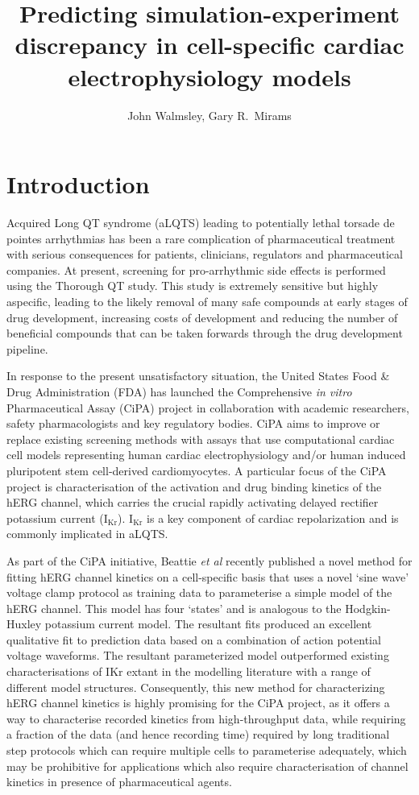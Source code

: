 \documentclass[11pt,a4paper,oneside]{article}
\author{John Walmsley, Gary R.~Mirams}
\title{Predicting simulation-experiment discrepancy in cell-specific cardiac electrophysiology models}
\begin{document}
\maketitle

\section{Introduction}

Acquired Long QT syndrome (aLQTS) leading to potentially lethal torsade de pointes arrhythmias has been a rare complication of pharmaceutical treatment with serious consequences for patients, clinicians, regulators and pharmaceutical companies. At present, screening for pro-arrhythmic side effects is performed using the Thorough QT study. This study is extremely sensitive but highly aspecific, leading to the likely removal of many safe compounds at early stages of drug development, increasing costs of development and reducing the number of beneficial compounds that can be taken forwards through the drug development pipeline.

In response to the present unsatisfactory situation, the United States Food \& Drug Administration (FDA) has launched the Comprehensive \textit{in vitro} Pharmaceutical Assay (CiPA) project in collaboration with academic researchers, safety pharmacologists and key regulatory bodies. CiPA aims to improve or replace existing screening methods with assays that use computational cardiac cell models representing human cardiac electrophysiology and/or human induced pluripotent stem cell-derived cardiomyocytes. A particular focus of the CiPA project is characterisation of the activation and drug binding kinetics of the hERG channel, which carries the crucial rapidly activating delayed rectifier potassium current (I$_{\text{Kr}}$). I$_{\text{Kr}}$ is a key component of cardiac repolarization and is commonly implicated in aLQTS.

As part of the CiPA initiative, Beattie \textit{et al} recently published a novel method for fitting hERG channel kinetics on a cell-specific basis that uses a novel `sine wave' voltage clamp protocol as training data to parameterise a simple model of the hERG channel. This model has four `states' and is analogous to the Hodgkin-Huxley potassium current model. The resultant fits produced an excellent qualitative fit to prediction data based on a combination of action potential voltage waveforms. The resultant parameterized model outperformed existing characterisations of IKr extant in the modelling literature with a range of different model structures. Consequently, this new method for characterizing hERG channel kinetics is highly promising for the CiPA project, as it offers a way to characterise recorded kinetics from high-throughput data, while requiring a fraction of the data (and hence recording time) required by long traditional step protocols which can require multiple cells to parameterise adequately, which may be prohibitive for applications which also require characterisation of channel kinetics in presence of pharmaceutical agents.
\end{document}
